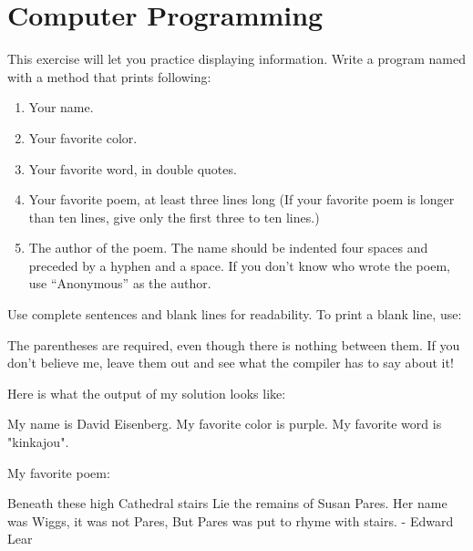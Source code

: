 \chapter{Computer Programming}

\begin{exercise}
This exercise will let you practice displaying information.  Write a program named  with a  method that prints following:

\begin{enumerate}
\item Your name.
\item Your favorite color.
\item Your favorite word, in double quotes.
\item Your favorite poem, at least three lines long (If your favorite poem is longer than ten lines, give only the first three to ten lines.)
\item The author of the poem. The name should be indented four spaces and preceded by a hyphen and a space. If you don't know who wrote the poem, use ``Anonymous'' as the author.
\end{enumerate}

Use complete sentences and blank lines for readability.  To print a blank line, use:


The parentheses are required, even though there is nothing between them. If you don't believe me, leave them out and see what the compiler has to say about it!

Here is what the output of my solution looks like:

\begin{stdout}
My name is David Eisenberg.
My favorite color is purple.
My favorite word is "kinkajou".

My favorite poem:

Beneath these high Cathedral stairs
Lie the remains of Susan Pares.
Her name was Wiggs, it was not Pares,
But Pares was put to rhyme with stairs.
    - Edward Lear
\end{stdout}
\end{exercise}
